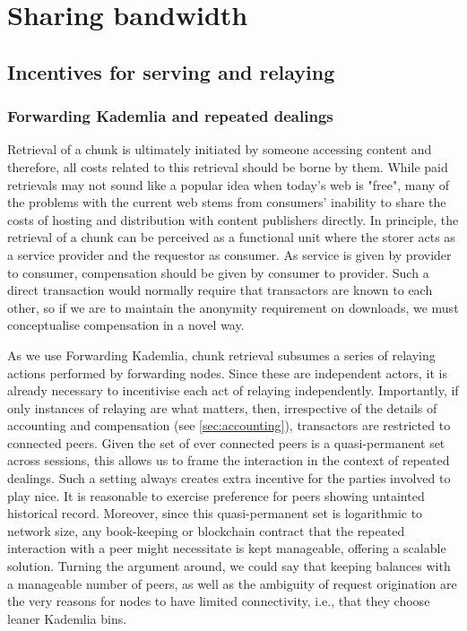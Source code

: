 \section{Sharing bandwidth\statusgreen}

\green{}

\subsection{Incentives for serving and relaying\statusgreen}\label{sec:incentives-relaying}

\green{}

\subsubsection{Forwarding Kademlia and repeated dealings}

Retrieval of a chunk is ultimately initiated by someone accessing content and therefore, all costs related to this retrieval should be borne by them. While paid retrievals may not sound like a popular idea when today's web is "free", many of the problems with the current web stems from consumers' inability to share the costs of hosting and distribution with content publishers directly. In principle, the retrieval of a chunk can be perceived as a functional unit where the storer acts as a service provider and the requestor as consumer. As service is given by provider to consumer, compensation should be given by consumer to provider. Such a direct transaction would normally require that transactors are known to each other, so if we are to maintain the anonymity requirement on downloads, we must conceptualise compensation in a novel way. 

As we use Forwarding Kademlia, chunk retrieval subsumes a series of relaying actions performed by forwarding nodes. Since these are independent actors, it is already necessary to incentivise each act of relaying independently. Importantly, if only instances of relaying are what matters, then, irrespective of the details of accounting and compensation (see \ref{sec:accounting}), transactors are restricted to connected peers. Given the set of ever connected peers is a quasi-permanent set across sessions, this allows us to frame the interaction in the context of repeated dealings. Such a setting always creates extra incentive for the parties involved to play nice. It is reasonable to exercise preference for peers showing untainted historical record. Moreover, since this quasi-permanent set is logarithmic to network size, any book-keeping or blockchain contract that the repeated interaction with a peer might necessitate is kept manageable, offering a scalable solution. Turning the argument around, we could say that keeping balances with a manageable number of peers, as well as the ambiguity of request origination are the very reasons for nodes to have limited connectivity, i.e., that they choose leaner Kademlia bins.

